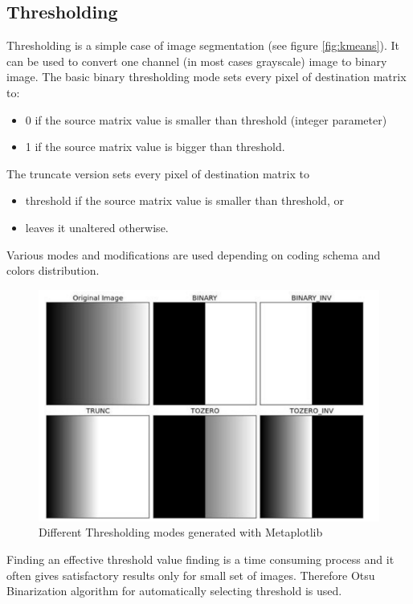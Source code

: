 \documentclass[12pt,twoside,a4paper]{article}
\begin{document}
\subsection{Thresholding}

Thresholding is a simple case of image segmentation (see figure \ref{fig:kmeans}).
It can be used to convert one channel (in most cases grayscale) image to binary image.
The basic binary thresholding mode sets every pixel of destination matrix to:
\begin{itemize}
\item 0 if the source matrix value is smaller than threshold (integer parameter)
\item 1 if the source matrix value is bigger than threshold.
\end{itemize}
The truncate version sets every pixel of destination matrix to
\begin{itemize}
\item threshold if the source matrix value is smaller than threshold, or
\item leaves it unaltered otherwise.
\end{itemize}
Various modes and modifications are used depending on coding schema and colors distribution.
  
\begin{figure}[H]
\centering
\includegraphics[width=0.4\paperwidth]{thr}
\caption{Different Thresholding modes generated with Metaplotlib}\label{fig:thr}
\end{figure}


Finding an effective threshold value finding is a time consuming process and it often gives satisfactory results only for small set of images.
Therefore Otsu Binarization algorithm for automatically selecting threshold is used.
\end{document}
